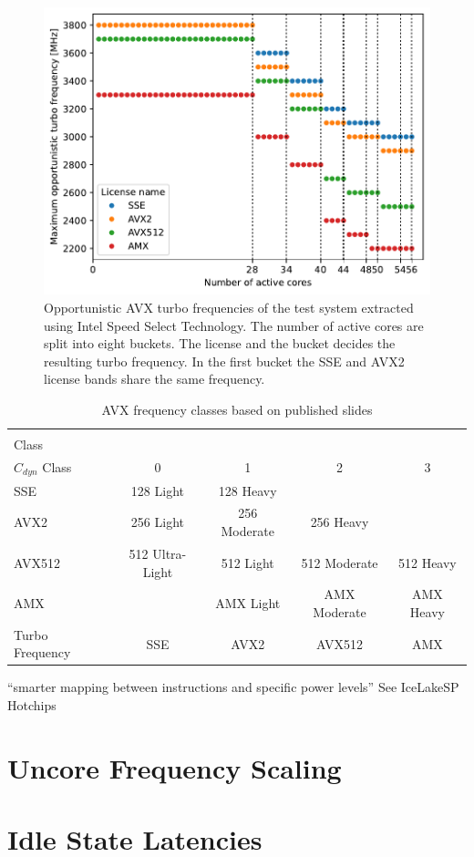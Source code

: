 \begin{figure}[]
    \centering
    \includegraphics[width=0.8\columnwidth]{fig/avx-frequency-license-bands.pdf}
    \caption{Opportunistic AVX turbo frequencies of the test system extracted using Intel Speed Select Technology.
    The number of active cores are split into eight buckets. The license and the bucket decides the resulting turbo frequency.
    In the first bucket the SSE and AVX2 license bands share the same frequency.}
\end{figure}




\begin{table}[t]
	\centering
	\caption{\label{tab:cdyn-classes}AVX frequency classes based on published slides}
	\begin{tabular}{|l|c|c|c|c|}
        \hline
        \diagbox[height=5em]{Instruction\\Class}{\\$C_{dyn}$ Class} & 0 & 1 & 2 & 3 \\
        \hline
        SSE & 128 Light & 128 Heavy & & \\
        AVX2 & 256 Light & 256 Moderate & 256 Heavy & \\
        AVX512 & 512 Ultra-Light & 512 Light & 512 Moderate & 512 Heavy \\
        AMX & & AMX Light & AMX Moderate & AMX Heavy \\
        \hline \hline
        Turbo Frequency & SSE & AVX2 & AVX512 & AMX \\ 
        \hline
	\end{tabular}
\end{table}

``smarter mapping between instructions and specific power levels'' See IceLakeSP Hotchips


\section{Uncore Frequency Scaling}

\section{Idle State Latencies}
